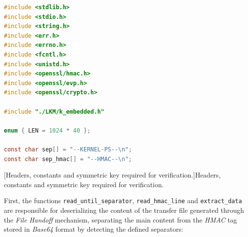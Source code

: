 \begin{lstlisting}[language=C]
#include <stdlib.h>
#include <stdio.h>
#include <string.h>
#include <err.h>
#include <errno.h>
#include <fcntl.h>
#include <unistd.h>
#include <openssl/hmac.h>
#include <openssl/evp.h>
#include <openssl/crypto.h>

#include "./LKM/k_embedded.h"

enum { LEN = 1024 * 40 };

const char sep[] = "--KERNEL-PS--\n";
const char sep_hmac[] = "--HMAC--\n";
\end{lstlisting}
\captionsetup{type=code,justification=centering,singlelinecheck=false}
[Headers, constants and symmetric key required for verification.]{Headers, constants and symmetric key required for verification.}
\label{cod:check_hmac}
\vspace{\baselineskip}

First, the functions \verb|read_until_separator|, \verb|read_hmac_line| and \verb|extract_data| are responsible for deserializing the content of the transfer file generated through the \textit{File Handoff} mechanism, separating the main content from the \textit{HMAC} tag stored in \textit{Base64} format by detecting the defined separators:

